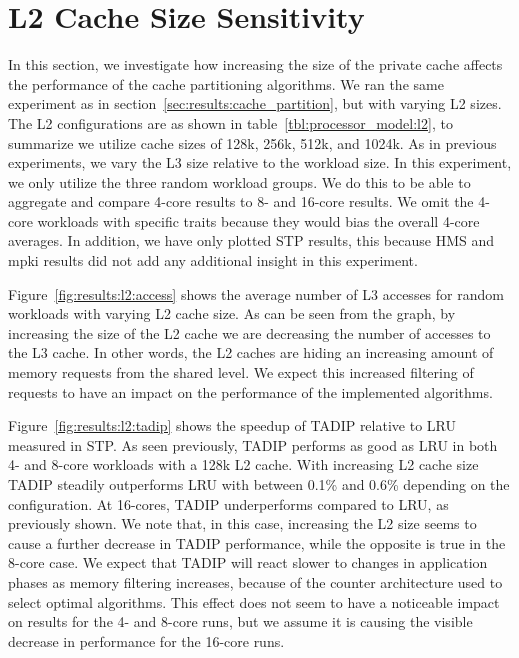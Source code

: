 \section{L2 Cache Size Sensitivity}
\label{sec:results:l2size_sensitivity}

In this section, we investigate how increasing the size of the private cache affects the performance of the cache partitioning algorithms.
We ran the same experiment as in section~\ref{sec:results:cache_partition}, but with varying L2 sizes.
The L2 configurations are as shown in table~\ref{tbl:processor_model:l2}, to summarize we utilize cache sizes of 128k, 256k, 512k, and 1024k.
As in previous experiments, we vary the L3 size relative to the workload size.
In this experiment, we only utilize the three random workload groups.
We do this to be able to aggregate and compare 4-core results to 8- and 16-core results.
We omit the 4-core workloads with specific traits because they would bias the overall 4-core averages.
In addition, we have only plotted STP results, this because HMS and mpki results did not add any additional insight in this experiment.

Figure~\ref{fig:results:l2:access} shows the average number of L3 accesses for random workloads with varying L2 cache size.
As can be seen from the graph, by increasing the size of the L2 cache we are decreasing the number of accesses to the L3 cache.
In other words, the L2 caches are hiding an increasing amount of memory requests from the shared level.
We expect this increased filtering of requests to have an impact on the performance of the implemented algorithms.

Figure~\ref{fig:results:l2:tadip} shows the speedup of TADIP relative to LRU measured in STP. 
As seen previously, TADIP performs as good as LRU in both 4- and 8-core workloads with a 128k L2 cache.
With increasing L2 cache size TADIP steadily outperforms LRU with between 0.1\% and 0.6\% depending on the configuration. 
At 16-cores, TADIP underperforms compared to LRU, as previously shown.
We note that, in this case, increasing the L2 size seems to cause a further decrease in TADIP performance, while the opposite is true in the 8-core case.
We expect that TADIP will react slower to changes in application phases as memory filtering increases, because of the counter architecture used to select optimal algorithms.
This effect does not seem to have a noticeable impact on results for the 4- and 8-core runs, but we assume it is causing the visible decrease in performance for the 16-core runs.

